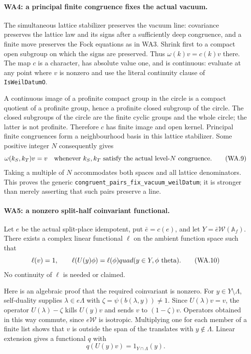 \paragraph{WA4: a principal finite congruence fixes the actual vacuum.}
The simultaneous lattice stabilizer preserves the vacuum line:
covariance preserves the lattice law and its signs after a
sufficiently deep congruence, and a finite move preserves the
Fock equations as in WA3.  Shrink first to a compact open subgroup
on which the signs are preserved.  Thus
$\omega(k)v=c(k)v$ there.  The map $c$ is a character, has absolute
value one, and is continuous: evaluate at any point where $v$ is
nonzero and use the literal continuity clause of
\texttt{IsWeilDatumO}.

A continuous image of a profinite compact group in the circle is
a compact quotient of a profinite group, hence a profinite closed
subgroup of the circle.  The closed subgroups of the circle are
the finite cyclic groups and the whole circle; the latter is not
profinite.  Therefore $c$ has finite image and open kernel.
Principal finite congruences form a neighbourhood basis in this
lattice stabilizer.  Some positive integer $N$ consequently gives
\[
 \omega(k_S,k_T)v=v
       \quad\hbox{whenever }k_S,k_T\hbox{ satisfy the actual
                                      level-}N\hbox{ congruence}.
                                                               \tag{WA.9}
\]
Taking a multiple of $N$ accommodates both spaces and all lattice
denominators.  This proves the generic
\texttt{congruent\_pairs\_fix\_vacuum\_weilDatum}; it is stronger
than merely asserting that such pairs preserve a line.

\paragraph{WA5: a nonzero split-half coinvariant functional.}
Let $e$ be the actual split-place idempotent, put $\bar e=c(e)$,
and let $Y=\bar e\mathcal W(\mathbb A_f)$.  There exists a complex
linear functional $\ell$ on the ambient function space such that
\[
 \ell(v)=1,\qquad
 \ell(U(y)\phi)=\ell(\phi)quad(y\in Y, \phi\hbox{ theta}).
                                                               \tag{WA.10}
\]
No continuity of $\ell$ is needed or claimed.

Here is an algebraic proof that the required coinvariant is nonzero.
For $y\in Y\setminus\Lambda$, self-duality supplies
$\lambda\in e\Lambda$ with
$\zeta=\psi(b(\lambda,y))\ne1$.  Since $U(\lambda)v=v$,
the operator $U(\lambda)-\zeta$ kills $U(y)v$ and sends $v$ to
$(1-\zeta)v$.  Operators obtained in this way commute, since
$e\mathcal W$ is isotropic.  Multiplying one for each member of a
finite list shows that $v$ is outside the span of the translates
with $y\notin\Lambda$.  Linear extension gives a functional $q$
with
\[
                 q(U(y)v)=1_{Y\cap\Lambda}(y).              \tag{WA.11}
\]

